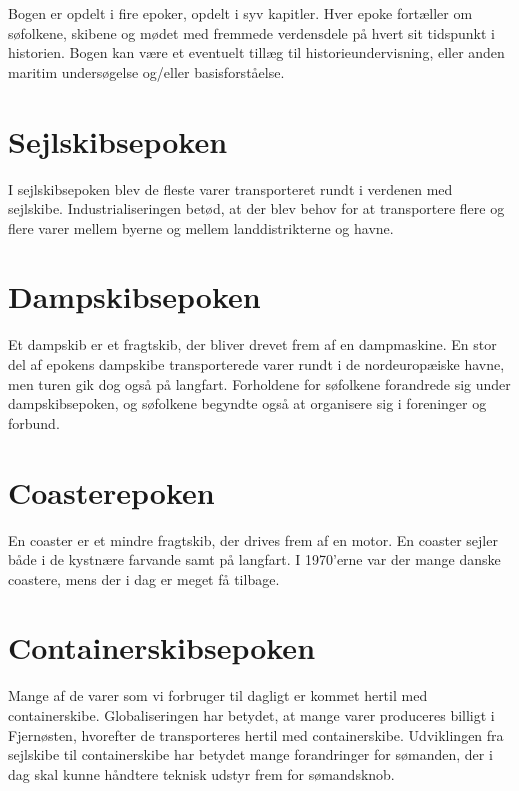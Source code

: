 \begin{Abstract}

Bogen er opdelt i fire epoker, opdelt i syv kapitler. Hver epoke
fortæller om søfolkene, skibene og mødet med fremmede verdensdele på
hvert sit tidspunkt i historien. Bogen kan være et eventuelt tillæg til
historieundervisning, eller anden maritim undersøgelse og/eller
basisforståelse.

\section*{Sejlskibsepoken}

I sejlskibsepoken blev de fleste varer transporteret rundt i verdenen
med sejlskibe. Industrialiseringen betød, at der blev behov for at
transportere flere og flere varer mellem byerne og mellem
landdistrikterne og havne.

\section*{Dampskibsepoken}

Et dampskib er et fragtskib, der bliver drevet frem af en dampmaskine.
En stor del af epokens dampskibe transporterede varer rundt i de
nordeuropæiske havne, men turen gik dog også på langfart. Forholdene for
søfolkene forandrede sig under dampskibsepoken, og søfolkene begyndte
også at organisere sig i foreninger og forbund.

\section*{Coasterepoken}

En coaster er et mindre fragtskib, der drives frem af en motor. En
coaster sejler både i de kystnære farvande samt på langfart. I 1970'erne
var der mange danske coastere, mens der i dag er meget få tilbage.

\section*{Containerskibsepoken}

Mange af de varer som vi forbruger til dagligt er kommet hertil med
containerskibe. Globaliseringen har betydet, at mange varer produceres
billigt i Fjernøsten, hvorefter de transporteres hertil med
containerskibe. Udviklingen fra sejlskibe til containerskibe har betydet
mange forandringer for sømanden, der i dag skal kunne håndtere teknisk
udstyr frem for sømandsknob.
\end{Abstract}
